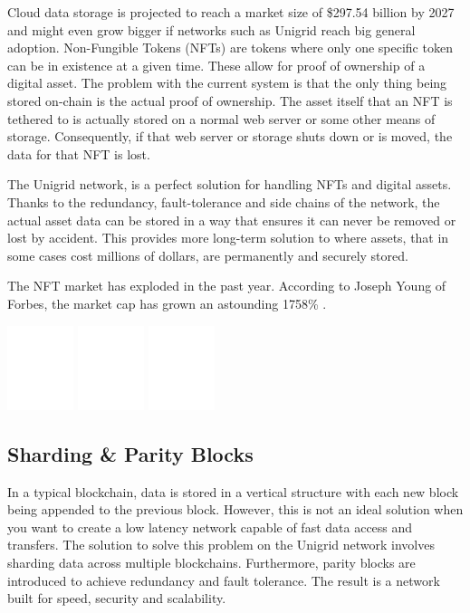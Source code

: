 \documentclass{article}
\begin{document}
Cloud data storage is projected to reach a market size of \$297.54 billion by 2027 \cite{fort2021} and might even grow bigger if networks such as Unigrid reach big general adoption. Non-Fungible Tokens (NFTs) are tokens where only one specific token can be in existence at a given time. These allow for proof of ownership of a digital asset. The problem with the current system is that the only thing being stored on-chain is the actual proof of ownership. The asset itself that an NFT is tethered to is actually stored on a normal web server or some other means of storage. Consequently, if that web server or storage shuts down or is moved, the data for that NFT is lost.

The Unigrid network, is a perfect solution for handling NFTs and digital assets. Thanks to the redundancy, fault-tolerance and side chains of the network, the actual asset data can be stored in a way that ensures it can never be removed or lost by accident. This provides more long-term solution to where assets, that in some cases cost millions of dollars, are permanently and securely stored.

The NFT market has exploded in the past year. According to Joseph Young of Forbes, the market cap has grown an astounding 1758\% \cite{young2021}.

\begin{center}
\includegraphics[width=55pt]{redundancy}
\hspace{1.5cm}
\includegraphics[width=55pt]{tolerance}
\hspace{1.5cm}
\includegraphics[width=55pt]{load-balance}
\end{center}
\subsection{Sharding \& Parity Blocks}
In a typical blockchain, data is stored in a vertical structure with each new block being appended to the previous block. However, this is not an ideal solution when you want to create a low latency network capable of fast data access and transfers. The solution to solve this problem on the Unigrid network involves sharding data across multiple blockchains. Furthermore, parity blocks are introduced to achieve redundancy and fault tolerance. The result is a network built for speed, security and scalability.
\end{document}
